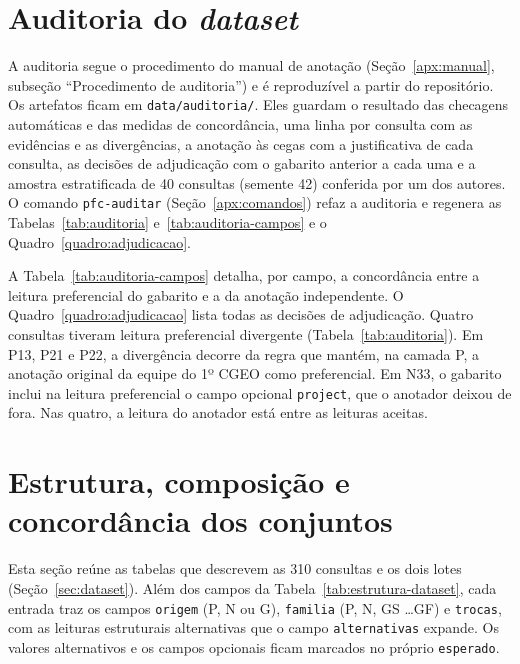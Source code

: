 \section{Auditoria do \textit{dataset}}
\label{apx:auditoria}

A auditoria segue o procedimento do manual de anotação (Seção~\ref{apx:manual}, subseção ``Procedimento de auditoria'') e é reproduzível a partir do repositório. Os artefatos ficam em \texttt{data/auditoria/}. Eles guardam o resultado das checagens automáticas e das medidas de concordância, uma linha por consulta com as evidências e as divergências, a anotação às cegas com a justificativa de cada consulta, as decisões de adjudicação com o gabarito anterior a cada uma e a amostra estratificada de 40 consultas (semente 42) conferida por um dos autores. O comando \texttt{pfc-auditar} (Seção~\ref{apx:comandos}) refaz a auditoria e regenera as Tabelas~\ref{tab:auditoria} e~\ref{tab:auditoria-campos} e o Quadro~\ref{quadro:adjudicacao}.

A Tabela~\ref{tab:auditoria-campos} detalha, por campo, a concordância entre a leitura preferencial do gabarito e a da anotação independente. O Quadro~\ref{quadro:adjudicacao} lista todas as decisões de adjudicação. Quatro consultas tiveram leitura preferencial divergente (Tabela~\ref{tab:auditoria}). Em P13, P21 e P22, a divergência decorre da regra que mantém, na camada P, a anotação original da equipe do 1º CGEO como preferencial. Em N33, o gabarito inclui na leitura preferencial o campo opcional \texttt{project}, que o anotador deixou de fora. Nas quatro, a leitura do anotador está entre as leituras aceitas.





\clearpage
\section{Estrutura, composição e concordância dos conjuntos}
\label{apx:dataset-tabelas}

Esta seção reúne as tabelas que descrevem as 310 consultas e os dois lotes (Seção~\ref{sec:dataset}). Além dos campos da Tabela~\ref{tab:estrutura-dataset}, cada entrada traz os campos \texttt{origem} (P, N ou G), \texttt{familia} (P, N, GS \ldots GF) e \texttt{trocas}, com as leituras estruturais alternativas que o campo \texttt{alternativas} expande. Os valores alternativos e os campos opcionais ficam marcados no próprio \texttt{esperado}.

